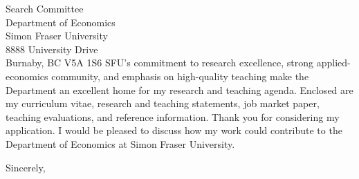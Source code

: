 \documentclass[10pt]{letter}
\begin{document}
\begin{letter}{Search Committee\\Department of Economics\\Simon Fraser University\\8888 University Drive\\Burnaby, BC V5A 1S6}
SFU's commitment to research excellence, strong applied-economics community, and emphasis on high-quality teaching make the Department an excellent home for my research and teaching agenda. Enclosed are my curriculum vitae, research and teaching statements, job market paper, teaching evaluations, and reference information. Thank you for considering my application. I would be pleased to discuss how my work could contribute to the Department of Economics at Simon Fraser University.

\closing{Sincerely,}
\end{letter}
\end{document}
